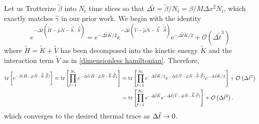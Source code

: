 Let us Trotterize $\tilde{\beta}$ into $N_t$ time slices so that $\Delta \tilde{t} = \tilde{\beta}/N_t = \beta/M \Delta x^2 N_t$, which exactly matches $\hat{\gamma}$ in our prior work.
We begin with the identity
\begin{equation}
	e^{-\Delta \tilde{t}(\tilde{H} - \tilde{\mu}\tilde{N} - \tilde{\vec{h}}\cdot\tilde{\vec{S}})}
	=
	e^{-\Delta \tilde{t}\tilde{K} / 2}
	e^{-\Delta \tilde{t} (\tilde{V} - \tilde{\mu} \tilde{N} - \tilde{\vec{h}}\cdot \tilde{\vec{S}})}
	e^{-\Delta \tilde{t}\tilde{K} / 2}
	+
	\mathcal{O}(\Delta \tilde{t}^3) 
\end{equation}
where $\tilde{H} = \tilde{K} + \tilde{V}$ has been decomposed into the kinetic energy $\tilde{K}$ and the interaction term $\tilde{V}$ as in \eqref{dimensionless hamiltonian}.
Therefore,
\begin{align}
	\text{tr}\left[e^{-\tilde{\beta}(\tilde{H}-\tilde{\mu} \tilde{N} - \tilde{\vec{h}}\cdot \tilde{\vec{S}})}\right]
	=
	\text{tr}\left[
		\prod_{t=1}^{N_t}
		e^{-\Delta \tilde{t} (\tilde{H}-\tilde{\mu}\tilde{N} - \tilde{\vec{h}}\cdot \tilde{\vec{S}})}
	\right]
	&=
	\text{tr}\left[
		\prod_{t=1}^{N_t}
		e^{-\Delta \tilde{t}\tilde{K} / 2}
		e^{-\Delta \tilde{t} (\tilde{V} - \tilde{\mu} \tilde{N} - \tilde{\vec{h}}\cdot \tilde{\vec{S}})}
		e^{-\Delta \tilde{t}\tilde{K} / 2}
	\right]
	+ \mathcal{O}\left(\Delta \tilde{t}^2\right)
	\nonumber\\
	&=
	\text{tr}\left[
		\prod_{t=1}^{N_t}
		e^{-\Delta \tilde{t}\tilde{K}}
		e^{-\Delta \tilde{t} (\tilde{V} - \tilde{\mu} \tilde{N} - \tilde{\vec{h}}\cdot \tilde{\vec{S}})}
	\right]
	+ \mathcal{O}\left(\Delta \tilde{t}^2\right).
	\label{eq:trotterization}
\end{align}
which converges to the desired thermal trace as $\Delta \tilde{t} \rightarrow 0$.

